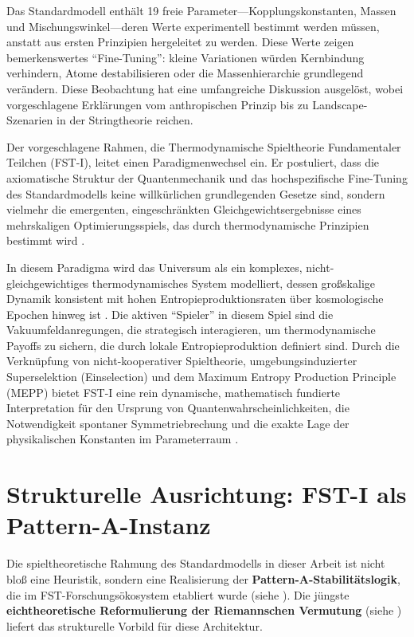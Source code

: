 \documentclass[12pt,a4paper]{article}
\theoremstyle{remark}
\begin{document}
Das Standardmodell enth\"alt 19 freie Parameter---Kopplungskonstanten, Massen und Mischungswinkel---deren Werte experimentell bestimmt werden m\"ussen, anstatt aus ersten Prinzipien hergeleitet zu werden. Diese Werte zeigen bemerkenswertes ``Fine-Tuning'': kleine Variationen w\"urden Kernbindung verhindern, Atome destabilisieren oder die Massenhierarchie grundlegend ver\"andern. Diese Beobachtung hat eine umfangreiche Diskussion ausgel\"ost, wobei vorgeschlagene Erkl\"arungen vom anthropischen Prinzip \citep{Weinberg1987,Susskind2005} bis zu Landscape-Szenarien in der Stringtheorie \citep{Bousso2000} reichen.

Der vorgeschlagene Rahmen, die Thermodynamische Spieltheorie Fundamentaler Teilchen (FST-I), leitet einen Paradigmenwechsel ein. Er postuliert, dass die axiomatische Struktur der Quantenmechanik und das hochspezifische Fine-Tuning des Standardmodells keine willk\"urlichen grundlegenden Gesetze sind, sondern vielmehr die emergenten, eingeschr\"ankten Gleichgewichtsergebnisse eines mehrskaligen Optimierungsspiels, das durch thermodynamische Prinzipien bestimmt wird \citep{QuantumStrategies2024}.

In diesem Paradigma wird das Universum als ein komplexes, nicht-gleichgewichtiges thermodynamisches System modelliert, dessen gro\ss{}skalige Dynamik konsistent mit hohen Entropieproduktionsraten \"uber kosmologische Epochen hinweg ist \citep{MEPP2010}. Die aktiven ``Spieler'' in diesem Spiel sind die Vakuumfeldanregungen, die strategisch interagieren, um thermodynamische Payoffs zu sichern, die durch lokale Entropieproduktion definiert sind. Durch die Verkn\"upfung von nicht-kooperativer Spieltheorie, umgebungsinduzierter Superselektion (Einselection) und dem Maximum Entropy Production Principle (MEPP) bietet FST-I eine rein dynamische, mathematisch fundierte Interpretation f\"ur den Ursprung von Quantenwahrscheinlichkeiten, die Notwendigkeit spontaner Symmetriebrechung und die exakte Lage der physikalischen Konstanten im Parameterraum \citep{HiggsVEV2024}.

\section{Strukturelle Ausrichtung: FST-I als Pattern-A-Instanz}
\label{sec:structural-alignment}

Die spieltheoretische Rahmung des Standardmodells in dieser Arbeit ist nicht blo\ss{} eine Heuristik, sondern eine Realisierung der \textbf{Pattern-A-Stabilit\"atslogik}, die im FST-Forschungs\"okosystem etabliert wurde (siehe \cite{FST-Unified2026}). Die j\"ungste \textbf{eichtheoretische Reformulierung der Riemannschen Vermutung} (siehe \cite{GeigerRH2026c}) liefert das strukturelle Vorbild f\"ur diese Architektur.
\end{document}
